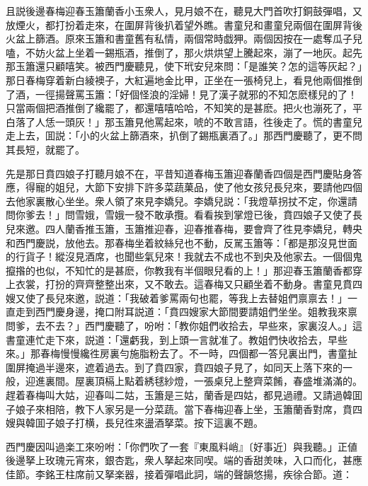 且説後邊春梅迎春玉簫蘭香小玉衆人，見月娘不在，聽見大門首吹打銅鼓彈唱，又放煙火，都打扮着走來，在圍屏背後扒着望外瞧。書童兒和畫童兒兩個在圍屏背後火盆上篩酒。原來玉簫和書童舊有私情，兩個常時戯狎。兩個因按在一處奪瓜子兒嗑，不妨火盆上坐着一錫瓶酒，推倒了，那火烘烘望上騰起來，漰了一地灰。起先那玉簫還只顧嘻笑。被西門慶聽見，使下玳安兒來問：「是誰笑？怎的這等灰起？」那日春梅穿着新白綾襖子，大紅遍地金比甲，正坐在一張椅兒上，看見他兩個推倒了酒，一徑揚聲罵玉簫：「好個怪浪的淫婦！見了漢子就邪的不知怎麽樣兒的了！只當兩個把酒推倒了纔罷了，都還嘻嘻哈哈，不知笑的是甚麽。把火也漰死了，平白落了人恁一頭灰！」那玉簫見他罵起來，唬的不敢言語，徃後走了。慌的書童兒走上去，囬説：「小的火盆上篩酒來，扒倒了錫瓶裏酒了。」那西門慶聽了，更不問其長短，就罷了。

先是那日賁四娘子打聽月娘不在，平昔知道春梅玉簫迎春蘭香四個是西門慶貼身答應，得寵的姐兒，大節下安排下許多菜蔬菓品，使了他女孩兒長兒來，要請他四個去他家裏散心坐坐。衆人領了來見李嬌兒。李嬌兒説：「我燈草拐扙不定，你還請問你爹去！」問雪娥，雪娥一發不敢承攬。看看挨到掌燈已後，賁四娘子又使了長兒來邀。四人蘭香推玉簫，玉簫推迎春，迎春推春梅，要會齊了徃見李嬌兒，轉央和西門慶説，放他去。那春梅坐着紋絲兒也不動，反駡玉簫等：「都是那沒見世面的行貨子！縱沒見酒席，也聞些氣兒來！我就去不成也不到央及他家去。一個個鬼攛揝的也似，不知忙的是甚麽，你教我有半個眼兒看的上！」那迎春玉簫蘭香都穿上衣裳，打扮的齊齊整整出來，又不敢去。這春梅又只顧坐着不動身。書童見賁四嫂又使了長兒來邀，説道：「我破着爹罵兩句也罷，等我上去替姐們禀禀去！」一直走到西門慶身邊，掩口附耳説道：「賁四嫂家大節間要請姐們坐坐。姐教我來禀問爹，去不去？」西門慶聽了，吩咐：「教你姐們收拾去，早些來，家裏沒人。」這書童連忙走下來，説道：「還虧我，到上頭一言就准了。教姐們快收拾去，早些來。」那春梅慢慢纔徃房裏勻施脂粉去了。不一時，四個都一答兒裏出門，書童扯圍屏掩過半邊來，遮着過去。到了賁四家，賁四娘子見了，如同天上落下來的一般，迎進裏間。屋裏頂槅上點着綉毬紗燈，一張桌兒上整齊菜餚，春盛堆滿滿的。趕着春梅叫大姑，迎春叫二姑，玉簫是三姑，蘭香是四姑，都見過禮。又請過韓囬子娘子來相陪，教下人家另是一分菜蔬。當下春梅迎春上坐，玉簫蘭香對席，賁四嫂與韓囬子娘子打横，長兒徃來盪酒拏菜。按下這裏不題。

西門慶因叫過楽工來吩咐：「你們吹了一套『東風料峭』〔好事近〕與我聽。」正値後邊拏上玫瑰元宵來，銀杏匙，衆人拏起來同喫。端的香甜羙味，入口而化，甚應佳節。李銘王柱席前又拏楽器，接着彈唱此詞，端的聲韻悠揚，疾徐合節。道：

